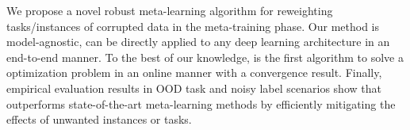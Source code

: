 \vspace{-1mm}
We propose a novel robust meta-learning algorithm for reweighting tasks/instances of corrupted data in the meta-training phase. Our method is model-agnostic, can be directly applied to any deep learning architecture in an end-to-end manner. To the best of our knowledge, \sysname{} is the first algorithm to solve a \textit{\biopt{}} optimization problem in an online manner with a convergence result. Finally, 
empirical evaluation results in OOD task and noisy label scenarios show that \sysname{} outperforms state-of-the-art meta-learning methods by efficiently mitigating the effects of unwanted instances or tasks. 
